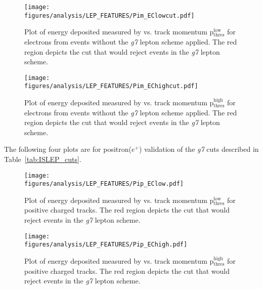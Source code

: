 \begin{figure}[h!]\begin{center}
\texttt{[image: \\figures/analysis/LEP\_FEATURES/Pim\_EClowcut.pdf]}
\caption[ Deposited Energy Comparison to Track Momentum for e$^-$ Candidates]{\label{fig:islep.pimEC}Plot of energy deposited measured by  vs. track momentum p$\mathrm{_{thres}^{low}}$ for electrons from \piz events without the \emph{g7} lepton   scheme applied. The red region depicts the cut that would reject events in the \emph{g7} lepton   scheme.}
\end{center}\end{figure}

\begin{figure}[h!]\begin{center}
\texttt{[image: \\figures/analysis/LEP\_FEATURES/Pim\_EChighcut.pdf]}
\caption[ Deposited Energy Comparison to Track Momentum for e$^-$ from \piz Events]{\label{fig:islep.pimECcut}Plot of energy deposited measured by  vs. track momentum p$\mathrm{_{thres}^{high}}$ for electrons from \piz events without the \emph{g7} lepton   scheme applied. The red region depicts the cut that would reject events in the \emph{g7} lepton   scheme.}
\end{center}\end{figure}
\FloatBarrier
The following four plots are for positron($e^+$)  validation of the \emph{g7} 
cuts described in Table~\ref{tab:ISLEP_cuts}.
%
%
%
%
\begin{figure}[h!]\begin{center}
\texttt{[image: \\figures/analysis/LEP\_FEATURES/Pip\_EClow.pdf]}
\caption[ Deposited Energy Comparison to Lower Threshold Track Momentum for q$^+$ Tracks]{\label{fig:islep.pipEClow}Plot of energy deposited measured by  vs. track momentum p$\mathrm{_{thres}^{low}}$ for positive charged tracks. The red region depicts the cut that would reject events in the \emph{g7} lepton   scheme.}
\end{center}\end{figure}

\begin{figure}[h!]\begin{center}
\texttt{[image: \\figures/analysis/LEP\_FEATURES/Pip\_EChigh.pdf]}
\caption[ Deposited Energy Comparison to Upper Threshold Track Momentum for q$^+$ Tracks]{\label{fig:islep.pipEChigh}Plot of energy deposited measured by  vs. track momentum p$\mathrm{_{thres}^{high}}$ for positive charged tracks. The red region depicts the cut that would reject events in the \emph{g7} lepton   scheme.}
\end{center}\end{figure}

